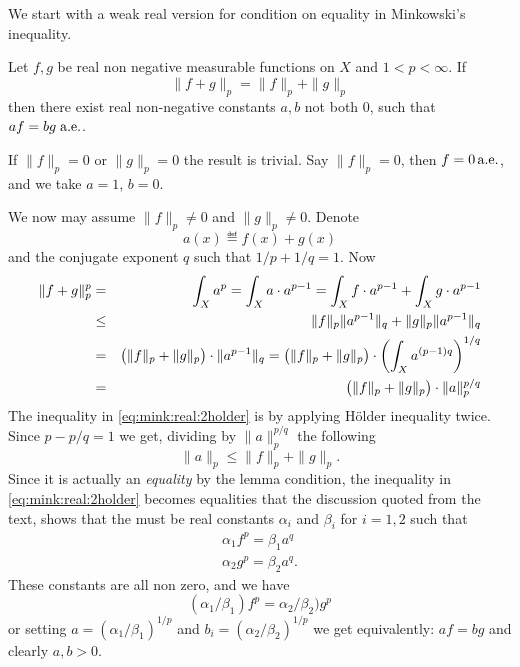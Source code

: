 We start with a weak
real version for condition on equality in Minkowski's inequality.
\begin{llem} \label{llem:mink:real:eq}
Let \(f,g\) be real non negative measurable functions on $X$ and \(1<p<\infty\).
If
\begin{equation}
 \| f + g \|_p = \|f\|_p + \|g\|_p
\end{equation}
then there exist
real non-negative constants \(a,b\) not both $0$, such that \(af=bg \;\textrm{a.e.}\).
\end{llem}
\begin{thmproof}
If \(\|f\|_p = 0\) or \(\|g\|_p = 0\) the result is trivial.
Say  \(\|f\|_p = 0\), then \(f=0\,\textrm{a.e.}\), and we take \(a=1\), \(b=0\).

We now may assume \(\|f\|_p \neq 0\) and \(\|g\|_p \neq 0\).
Denote
\[ a(x) \eqdef f(x) + g(x)\]
and the conjugate exponent $q$ such that \(1/p+1/q=1\).
Now
\begin{eqnarray}
\|f+g\|_p^p
&=& \int_X a^p
= \int_X a\cdot a^{p-1}
=    \int_X f\cdot a^{p-1} +\int_X g\cdot a^{p-1} \notag \\
&\leq& \|f\|_p \|a^{p-1}\|_q + \|g\|_p \|a^{p-1}\|_q
       \label{eq:mink:real:2holder} \\
&=& \bigl(\|f\|_p + \|g\|_p\bigr)\cdot\|a^{p-1}\|_q \notag
= \bigl(\|f\|_p + \|g\|_p\bigr)\cdot\left(\int_X a^{(p-1)q}\right)^{1/q}
   \notag \\
&=& \bigl(\|f\|_p + \|g\|_p\bigr)\cdot \|a\|_p^{p/q} \notag
\end{eqnarray}
The inequality in \eqref{eq:mink:real:2holder} is by applying H\"older
inequality twice.
Since \(p-p/q=1\) we get, dividing by \(\|a\|_p^{p/q}\) the following
\[
\|a\|_p \leq \|f\|_p + \|g\|_p.
\]
Since it is actually an \emph{equality} by the lemma condition,
the inequality in \eqref{eq:mink:real:2holder}
becomes equalities that the discussion quoted from the text,
shows that the must be real constants \(\alpha_i\) and \(\beta_i\)
for \(i=1,2\) such that
\begin{eqnarray*}
\alpha_1 f^p = \beta_1 a^q \\
\alpha_2 g^p = \beta_2 a^q.
\end{eqnarray*}
These constants are all non zero, and we have
\[( \alpha_1/\beta_1) f^p = \alpha_2/\beta_2) g^p\]
or setting
 \(a = (\alpha_1/\beta_1)^{1/p}\)
and
 \(b_i = (\alpha_2/\beta_2)^{1/p}\)
we get equivalently:
\( a f = bg\) and clearly \(a,b>0\).
\end{thmproof}



